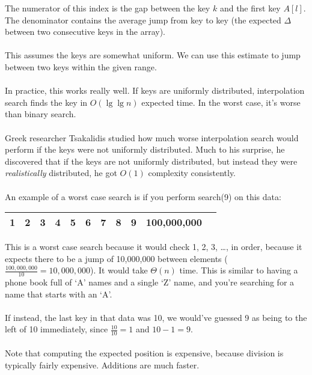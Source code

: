 \documentclass[]{article}
\theoremstyle{definition}
\newcommand{\lecture}[1]{\marginpar{{\footnotesize $\leftarrow$ \underline{#1}}}}
\begin{document}
			The numerator of this index is the gap between the key $k$ and the first key $A[l]$. The denominator contains the average jump from key to key (the expected $\Delta$ between two consecutive keys in the array).
			\\ \\
			This assumes the keys are somewhat uniform. We can use this estimate to jump between two keys within the given range.
			\\ \\
			In practice, this works really well. If keys are uniformly distributed, interpolation search finds the key in $O(\lg \lg n)$ expected time. In the worst case, it's worse than binary search.
			\\ \\
			Greek researcher Tsakalidis studied how much worse interpolation search would perform if the keys were not uniformly distributed. Much to his surprise, he discovered that if the keys are not uniformly distributed, but instead they were \emph{realistically} distributed, he got $O(1)$ complexity consistently.
			\\ \\
			\lecture{March 7, 2013} An example of a worst case search is if you perform search(9) on this data:
			\begin{center}
				\begin{tabular}{|c|c|c|c|c|c|c|c|c|c|c|}
					\hline
					1 & 2 & 3 & 4 & 5 & 6 & 7 & 8 & 9 & 100,000,000 \\ \hline
				\end{tabular}
			\end{center}
			This is a worst case search because it would check 1, 2, 3, \ldots, in order, because it expects there to be a jump of 10,000,000 between elements ($\frac{100,000,000}{10} = 10,000,000$). It would take $\Theta(n)$ time. This is similar to having a phone book full of `A' names and a single `Z' name, and you're searching for a name that starts with an `A'.
			\\ \\
			If instead, the last key in that data was 10, we would've guessed 9 as being to the left of 10 immediately, since $\frac{10}{10} = 1$ and $10 - 1 = 9$.
			\\ \\
			Note that computing the expected position is expensive, because division is typically fairly expensive. Additions are much faster.
\end{document}

